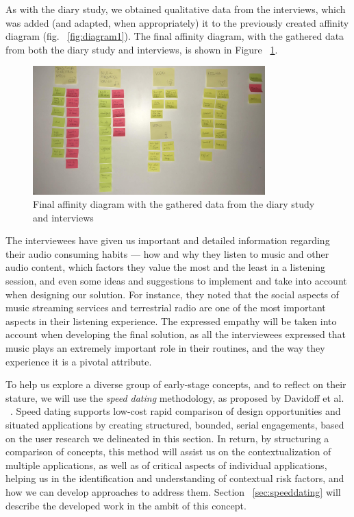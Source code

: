 As with the diary study, we obtained qualitative data from the interviews, which was added (and adapted, when appropriately) it to the previously created affinity diagram (fig. ~\ref{fig:diagram1}). The final affinity diagram, with the gathered data from both the diary study and interviews, is shown in Figure ~\ref{fig:diagram2}.

\begin{figure}[h]
\centering
\includegraphics[width=0.8\textwidth]{./Images/finalaffinitydiagram.jpg}
\caption{Final affinity diagram with the gathered data from the diary study and interviews}
\label{fig:diagram2}
\end{figure}

The interviewees have given us important and detailed information regarding their audio consuming habits — how and why they listen to music and other audio content, which factors they value the most and the least in a listening session, and even some ideas and suggestions to implement and take into account when designing our solution. For instance, they noted that the social aspects of music streaming services and terrestrial radio are one of the most important aspects in their listening experience. The expressed empathy will be taken into account when developing the final solution, as all the interviewees expressed that music plays an extremely important role in their routines, and the way they experience it is a pivotal attribute.

To help us explore a diverse group of early-stage concepts, and to reflect on their stature, we will use the \textit{speed dating} methodology, as proposed by Davidoff et al. ~\cite{Davidoff2007}. Speed dating supports low-cost rapid comparison of design opportunities and situated applications by creating structured, bounded, serial engagements, based on the user research we delineated in this section. In return, by structuring a comparison of concepts, this method will assist us on the contextualization of multiple applications, as well as of critical aspects of individual applications, helping us in the identification and understanding of contextual risk factors, and how we can develop approaches to address them. Section ~\ref{sec:speeddating} will describe the developed work in the ambit of this concept.